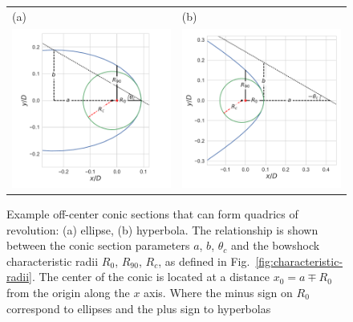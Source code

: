 \begin{figure}
\setlength\tabcolsep{0pt}
\begin{tabular}{ll}
  (a) & (b) \\
  \includegraphics[height=0.45\linewidth]{figs/ellipse_py}
      & \includegraphics[height=0.45\linewidth]{figs/hyperbola_py}
\end{tabular}
\label{fig:conics}
\caption{Example off-center conic sections that can form quadrics of
  revolution: (a) ellipse, (b) hyperbola.  The relationship is shown
  between the conic section parameters \(a\), \(b\), \(\theta_c\) and
  the bowshock characteristic radii \(R_0\), \(R_{90}\), \(R_c\), as
  defined in Fig.~\ref{fig:characteristic-radii}. The center of the
  conic is located at a distance $x_0=a \mp R_0$ from the origin along the
  $x$ axis. Where the minus sign on $R_0$ correspond to ellipses and the plus
  sign to hyperbolas}
\end{figure}
